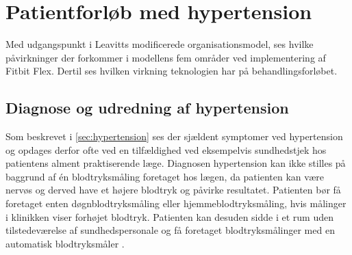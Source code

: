 \section{Patientforløb med hypertension}
Med udgangspunkt i Leavitts modificerede organisationsmodel, ses hvilke påvirkninger der forkommer i modellens fem områder ved implementering af Fitbit Flex. Dertil ses hvilken virkning teknologien har på behandlingsforløbet.

\subsection{Diagnose og udredning af hypertension} \label{sec:dia_hypertension}
Som beskrevet i \autoref{sec:hypertension} ses der sjældent symptomer ved hypertension og opdages derfor ofte ved en tilfældighed ved eksempelvis sundhedstjek hos patientens alment praktiserende læge. 
Diagnosen hypertension kan ikke stilles på baggrund af én blodtryksmåling foretaget hos lægen, da patienten kan være nervøs og derved have et højere blodtryk og påvirke resultatet. Patienten bør få foretaget enten døgnblodtryksmåling eller hjemmeblodtryksmåling, hvis målinger i klinikken viser forhøjet blodtryk. Patienten kan desuden sidde i et rum uden tilstedeværelse af sundhedspersonale og få foretaget blodtryksmålinger med en automatisk blodtryksmåler \citep{lodberg2016, bech2015}.

